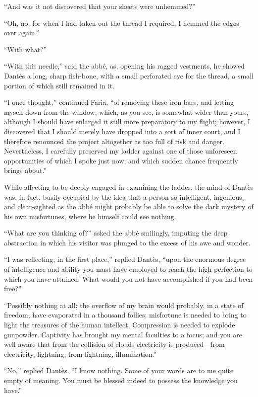 “And was it not discovered that your sheets were unhemmed?”

“Oh, no, for when I had taken out the thread I required, I hemmed the
edges over again.”

“With what?”

“With this needle,” said the abbé, as, opening his ragged vestments, he
showed Dantès a long, sharp fish-bone, with a small perforated eye for
the thread, a small portion of which still remained in it.

“I once thought,” continued Faria, “of removing these iron bars, and
letting myself down from the window, which, as you see, is somewhat
wider than yours, although I should have enlarged it still more
preparatory to my flight; however, I discovered that I should merely
have dropped into a sort of inner court, and I therefore renounced the
project altogether as too full of risk and danger. Nevertheless, I
carefully preserved my ladder against one of those unforeseen
opportunities of which I spoke just now, and which sudden chance
frequently brings about.”

While affecting to be deeply engaged in examining the ladder, the mind
of Dantès was, in fact, busily occupied by the idea that a person so
intelligent, ingenious, and clear-sighted as the abbé might probably be
able to solve the dark mystery of his own misfortunes, where he himself
could see nothing.

“What are you thinking of?” asked the abbé smilingly, imputing the deep
abstraction in which his visitor was plunged to the excess of his awe
and wonder.

“I was reflecting, in the first place,” replied Dantès, “upon the
enormous degree of intelligence and ability you must have employed to
reach the high perfection to which you have attained. What would you
not have accomplished if you had been free?”

“Possibly nothing at all; the overflow of my brain would probably, in a
state of freedom, have evaporated in a thousand follies; misfortune is
needed to bring to light the treasures of the human intellect.
Compression is needed to explode gunpowder. Captivity has brought my
mental faculties to a focus; and you are well aware that from the
collision of clouds electricity is produced—from electricity,
lightning, from lightning, illumination.”

“No,” replied Dantès. “I know nothing. Some of your words are to me
quite empty of meaning. You must be blessed indeed to possess the
knowledge you have.”

